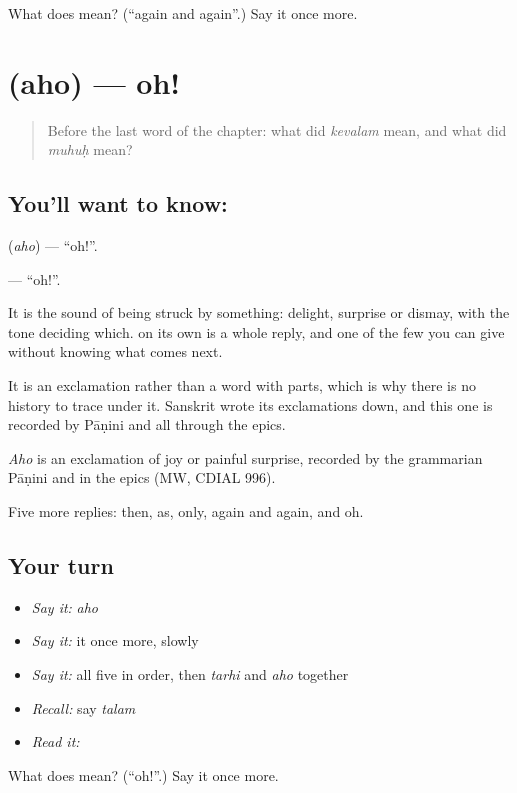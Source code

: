 \begin{tcolorbox}[breakable,colback=teal!4,colframe=teal!35!black,title={Before you move on}]
What does  mean? (\textquotedblleft{}again and again\textquotedblright{}.) Say it once more.
\end{tcolorbox}
\section[\texorpdfstring{\sk{अहो} (aho)}{अहो (aho)}]{ (aho) — oh!}

\label{lesson:SA-C49-oh}



\begin{quote}
Before the last word of the chapter: what did \emph{kevalam} mean, and what did \emph{muhuḥ} mean?
\end{quote}

\subsection*{You'll want to know: }
\textbf{} (\emph{aho}) — \textquotedblleft{}oh!\textquotedblright{}.

\textbf{} — \textquotedblleft{}oh!\textquotedblright{}.

It is the sound of being struck by something: delight, surprise or dismay, with the tone deciding which. \textbf{} on its own is a whole reply, and one of the few you can give without knowing what comes next.

It is an exclamation rather than a word with parts, which is why there is no history to trace under it. Sanskrit wrote its exclamations down, and this one is recorded by Pāṇini and all through the epics.

\begin{cousinweb}
\emph{Aho} is an exclamation of joy or painful surprise, recorded by the grammarian Pāṇini and in the epics (MW, CDIAL 996).
\end{cousinweb}

\begin{grammarlens}[title={What you've built}]
Five more replies: then, as, only, again and again, and oh.
\end{grammarlens}

\subsection*{Your turn}
\begin{itemize}
\raggedright
  \item \emph{Say it:} \emph{aho}
  \item \emph{Say it:} it once more, slowly
  \item \emph{Say it:} all five in order, then \emph{tarhi} and \emph{aho} together
  \item \emph{Recall:} say \emph{talam}
  \item \emph{Read it:} \textbf{}
\end{itemize}

\begin{tcolorbox}[breakable,colback=teal!4,colframe=teal!35!black,title={Before you move on}]
What does  mean? (\textquotedblleft{}oh!\textquotedblright{}.) Say it once more.
\end{tcolorbox}
